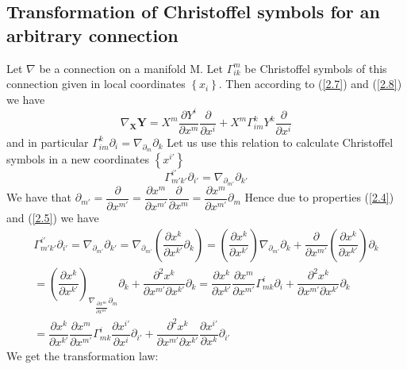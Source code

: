 \documentclass[a4paper,10pt]{article}
\newcommand{\christoffel}[3][i]{\ensuremath{\Gamma_{#1#2}^{#3}}}
\begin{document}
  \subsection{Transformation of Christoffel symbols for an arbitrary connection}
 Let $\nabla$ be a connection on a manifold M. Let {\christoffel{k}{m}} be Christoffel symbols of this connection
 given in local coordinates $\left\lbrace x_i\right\rbrace$. Then according to (\ref{2.7}) and (\ref{2.8}) we have
 \begin{equation}
  \nabla_{\mathbf{X}}\mathbf{Y} = X^{m}\dfrac{\partial Y^{i}}{\partial x^{m}} \dfrac{\partial}{\partial x^{i}} +
  X^{m} \christoffel{m}{k} Y^{k} \dfrac{\partial}{\partial x^{i}}
 \end{equation}
and in particular 
$\christoffel{m}{k} \partial_i = \nabla_{\partial_{m}} \partial_k$
Let us use this relation to calculate Christoffel symbols in a new coordinates 
$\left\lbrace x^{i'} \right\rbrace$ 
\begin{equation*}
\Gamma_{m'k'}^{i'}\partial_{i'} = \nabla_{\partial_{m'}}\partial_{k'}
\end{equation*}
We have that $\partial_{m'} = \dfrac{\partial}{\partial x^{m'}}=
\dfrac{\partial x^{m}}{\partial x^{m'}}\dfrac{\partial}{\partial x^{m}} = \dfrac{\partial x^{m}}{\partial x^{m'}}\partial_m$
Hence due to properties (\ref{2.4}) and (\ref{2.5}) we have 
\begin{eqnarray*}
\Gamma_{m'k'}^{i'}\partial_{i'} = \nabla_{\partial_{m'}}\partial_{k'} = \nabla_{\partial_{m'}}\left(\dfrac{\partial x^{k}}
{\partial x^{k'}}\partial_{k}\right) = \left(\dfrac{\partial x^{k}}{\partial x^{k'}}\right)\nabla_{\partial_{m'}}\partial_k
+\dfrac{\partial}{\partial x^{m'}}\left(\dfrac{\partial x^{k}}{\partial x^{k'}}\right)\partial_k 
\\
= \left(\dfrac{\partial x^{k}}{\partial x^{k'}} \right)_{\nabla_{\dfrac{\partial x^{m}}{\partial x^{m'}}}\partial_{m}}\partial_k
+ \dfrac{\partial^{2} x^{k}}{\partial x^{m'}\partial x^{k'}}\partial_k
= \dfrac{\partial x^{k}}{\partial x^{k'}} \dfrac{\partial x^{m}}{\partial x^{m'}} \Gamma^{i}_{mk}\partial_{i}
+ \dfrac{\partial^{2}x^{k}}{\partial x^{m'} \partial x^{k'}}\partial_{k}
\\ = \dfrac{\partial x^{k}}{\partial x^{k'}}\dfrac{\partial x^{m}}{\partial x^{m'}} \Gamma^{i}_{mk} 
\dfrac{\partial x^{i'}}{\partial x^{i}}\partial_{i'} + 
\dfrac{\partial^{2} x^{k}}{\partial x^{m'} \partial x^{k'}} 
\dfrac{\partial x^{i'}}{\partial x^{k}}\partial_{i'}
\end{eqnarray*}
We get the transformation law: 
\end{document}
